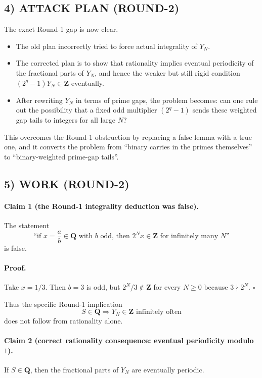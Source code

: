 \subsection*{4) ATTACK PLAN (ROUND-2)}
The exact Round-1 gap is now clear.

\begin{itemize}
\item The old plan incorrectly tried to force actual integrality of $Y_N$.
\item The corrected plan is to show that rationality implies eventual periodicity of the fractional parts of $Y_N$, and hence the weaker but still rigid condition $(2^q-1)Y_N\in\mathbf{Z}$ eventually.
\item After rewriting $Y_N$ in terms of prime gaps, the problem becomes: can one rule out the possibility that a fixed odd multiplier $(2^q-1)$ sends these weighted gap tails to integers for all large $N$?
\end{itemize}

This overcomes the Round-1 obstruction by replacing a false lemma with a true one, and it converts the problem from ``binary carries in the primes themselves'' to ``binary-weighted prime-gap tails''.

\subsection*{5) WORK (ROUND-2)}

\paragraph{Claim 1 (the Round-1 integrality deduction was false).}
The statement
\[
\text{``if }x=\frac{a}{b}\in\mathbf{Q}\text{ with }b\text{ odd, then }2^N x\in\mathbf{Z}\text{ for infinitely many }N\text{''}
\]
is false.

\paragraph{Proof.}
Take $x=1/3$. Then $b=3$ is odd, but $2^N/3\notin \mathbf{Z}$ for every $N\ge 0$ because $3\nmid 2^N$.
\hfill$\square$

Thus the specific Round-1 implication
\[
S\in\mathbf{Q}\Longrightarrow Y_N\in\mathbf{Z}\text{ infinitely often}
\]
does not follow from rationality alone.

\medskip

\paragraph{Claim 2 (correct rationality consequence: eventual periodicity modulo $1$).}
If $S\in\mathbf{Q}$, then the fractional parts of $Y_N$ are eventually periodic.

